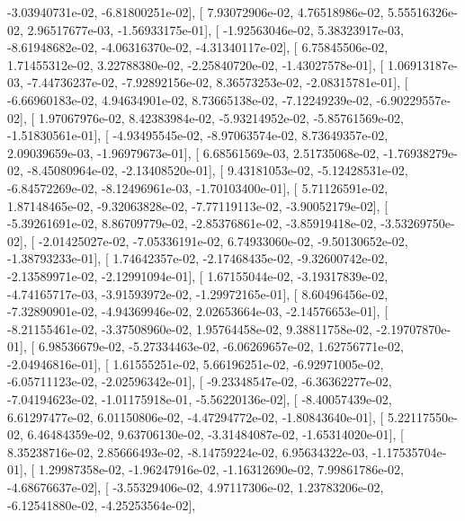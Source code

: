 \documentclass{article}
\begin{document}
         -3.03940731e-02,  -6.81800251e-02],
       [  7.93072906e-02,   4.76518986e-02,   5.55516326e-02,
          2.96517677e-03,  -1.56933175e-01],
       [ -1.92563046e-02,   5.38323917e-03,  -8.61948682e-02,
         -4.06316370e-02,  -4.31340117e-02],
       [  6.75845506e-02,   1.71455312e-02,   3.22788380e-02,
         -2.25840720e-02,  -1.43027578e-01],
       [  1.06913187e-03,  -7.44736237e-02,  -7.92892156e-02,
          8.36573253e-02,  -2.08315781e-01],
       [ -6.66960183e-02,   4.94634901e-02,   8.73665138e-02,
         -7.12249239e-02,  -6.90229557e-02],
       [  1.97067976e-02,   8.42383984e-02,  -5.93214952e-02,
         -5.85761569e-02,  -1.51830561e-01],
       [ -4.93495545e-02,  -8.97063574e-02,   8.73649357e-02,
          2.09039659e-03,  -1.96979673e-01],
       [  6.68561569e-03,   2.51735068e-02,  -1.76938279e-02,
         -8.45080964e-02,  -2.13408520e-01],
       [  9.43181053e-02,  -5.12428531e-02,  -6.84572269e-02,
         -8.12496961e-03,  -1.70103400e-01],
       [  5.71126591e-02,   1.87148465e-02,  -9.32063828e-02,
         -7.77119113e-02,  -3.90052179e-02],
       [ -5.39261691e-02,   8.86709779e-02,  -2.85376861e-02,
         -3.85919418e-02,  -3.53269750e-02],
       [ -2.01425027e-02,  -7.05336191e-02,   6.74933060e-02,
         -9.50130652e-02,  -1.38793233e-01],
       [  1.74642357e-02,  -2.17468435e-02,  -9.32600742e-02,
         -2.13589971e-02,  -2.12991094e-01],
       [  1.67155044e-02,  -3.19317839e-02,  -4.74165717e-03,
         -3.91593972e-02,  -1.29972165e-01],
       [  8.60496456e-02,  -7.32890901e-02,  -4.94369946e-02,
          2.02653664e-03,  -2.14576653e-01],
       [ -8.21155461e-02,  -3.37508960e-02,   1.95764458e-02,
          9.38811758e-02,  -2.19707870e-01],
       [  6.98536679e-02,  -5.27334463e-02,  -6.06269657e-02,
          1.62756771e-02,  -2.04946816e-01],
       [  1.61555251e-02,   5.66196251e-02,  -6.92971005e-02,
         -6.05711123e-02,  -2.02596342e-01],
       [ -9.23348547e-02,  -6.36362277e-02,  -7.04194623e-02,
         -1.01175918e-01,  -5.56220136e-02],
       [ -8.40057439e-02,   6.61297477e-02,   6.01150806e-02,
         -4.47294772e-02,  -1.80843640e-01],
       [  5.22117550e-02,   6.46484359e-02,   9.63706130e-02,
         -3.31484087e-02,  -1.65314020e-01],
       [  8.35238716e-02,   2.85666493e-02,  -8.14759224e-02,
          6.95634322e-03,  -1.17535704e-01],
       [  1.29987358e-02,  -1.96247916e-02,  -1.16312690e-02,
          7.99861786e-02,  -4.68676637e-02],
       [ -3.55329406e-02,   4.97117306e-02,   1.23783206e-02,
         -6.12541880e-02,  -4.25253564e-02],
\end{document}
